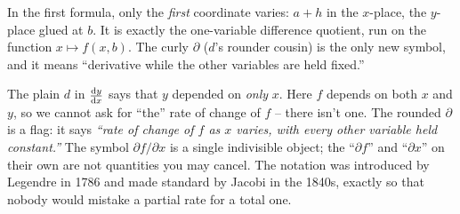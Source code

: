 In the first formula, only the \emph{first} coordinate varies: $a+h$ in the $x$-place, the
$y$-place glued at $b$. It is exactly the one-variable difference quotient, run on the
function $x \mapsto f(x,b)$. The curly $\partial$ ($d$'s rounder cousin) is the only new
symbol, and it means ``derivative while the other variables are held fixed.''

\begin{happeningbox}
The plain $d$ in $\frac{\mathrm{d} y}{\mathrm{d} x}$ says that $y$
depended on \emph{only} $x$. Here $f$ depends on both $x$ and $y$, so we cannot ask for
``the'' rate of change of $f$ -- there isn't one. The rounded $\partial$ is a flag: it says
\emph{``rate of change of $f$ as $x$ varies, with every other variable held constant.''} The
symbol $\partial f/\partial x$ is a single indivisible object; the ``$\partial f$'' and
``$\partial x$'' on their own are not quantities you may cancel. The notation was introduced
by Legendre in 1786 and made standard by Jacobi in the 1840s, exactly so that nobody would mistake a
partial rate for a total one.
\end{happeningbox}

